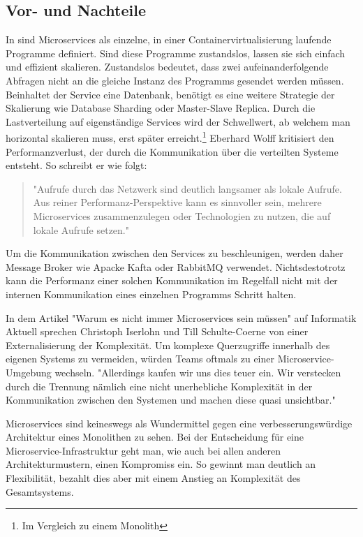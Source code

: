 \subsection{Vor- und Nachteile}
\label{subsec:vorundnachteile}
In  sind Microservices
als einzelne, in einer Containervirtualisierung laufende Programme definiert. Sind diese Programme
zustandslos, lassen sie sich einfach und effizient skalieren. Zustandslos bedeutet, dass zwei
aufeinanderfolgende Abfragen nicht an die gleiche Instanz des Programms gesendet werden müssen.
Beinhaltet der Service eine Datenbank, benötigt es eine weitere Strategie der Skalierung
wie Database Sharding oder Master-Slave Replica. Durch die Lastverteilung auf eigenständige Services
wird der Schwellwert, ab welchem man horizontal skalieren muss, erst später erreicht.\footnote{Im Vergleich zu einem Monolith}
Eberhard Wolff kritisiert den Performanzverlust, der durch die
Kommunikation über die verteilten Systeme entsteht. So schreibt er wie folgt: 

\begin{quote}
"Aufrufe durch das Netzwerk sind deutlich langsamer als lokale Aufrufe.
Aus reiner Performanz-Perspektive kann es sinnvoller sein, mehrere Microservices
zusammenzulegen oder Technologien zu nutzen, die auf lokale Aufrufe setzen."\cite[S. 65, 3. Absatz]{MicroservicesBook}
\end{quote}

Um die Kommunikation zwischen den Services zu beschleunigen, werden daher Message Broker wie
Apacke Kafta oder RabbitMQ verwendet. Nichtsdestotrotz kann die Performanz einer solchen
Kommunikation im Regelfall nicht mit der internen Kommunikation eines einzelnen Programms Schritt halten.

In dem Artikel "Warum es nicht immer Microservices sein müssen" auf Informatik Aktuell
sprechen Christoph Iserlohn und Till Schulte-Coerne von einer Externalisierung der Komplexität.
Um komplexe Querzugriffe innerhalb des eigenen Systems zu vermeiden, würden Teams oftmals 
zu einer Microservice-Umgebung wechseln. "Allerdings kaufen wir uns dies teuer ein.
Wir verstecken durch die Trennung nämlich eine nicht unerhebliche Komplexität in
der Kommunikation zwischen den Systemen und machen diese quasi unsichtbar."\cite[Paragraph 11]{InformatikAktuellWarumNichtImmerMicroservices}

Microservices sind keineswegs als Wundermittel gegen eine verbesserungswürdige Architektur eines
Monolithen zu sehen. Bei der Entscheidung für eine Microservice-Infrastruktur geht man, wie
auch bei allen anderen Architekturmustern, einen Kompromiss ein. So gewinnt man deutlich
an Flexibilität, bezahlt dies aber mit einem Anstieg an Komplexität des Gesamtsystems.

